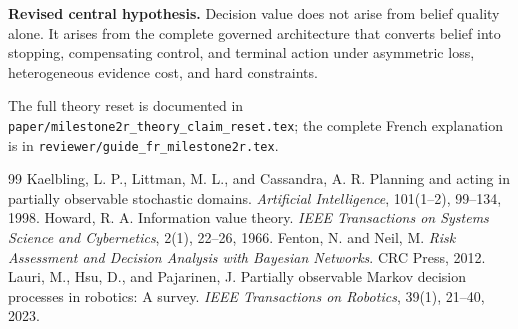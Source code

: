 \documentclass[11pt,a4paper]{article}
\begin{document}
\begin{tcolorbox}[colback=softgreen,colframe=green!45!black,boxrule=0.8pt,arc=2mm]
\textbf{Revised central hypothesis.} Decision value does not arise from belief quality alone. It arises from the complete governed architecture that converts belief into stopping, compensating control, and terminal action under asymmetric loss, heterogeneous evidence cost, and hard constraints.
\end{tcolorbox}

The full theory reset is documented in \texttt{paper/milestone2r\_theory\_claim\_reset.tex}; the complete French explanation is in \texttt{reviewer/guide\_fr\_milestone2r.tex}.

\begin{thebibliography}{99}
 Kaelbling, L. P., Littman, M. L., and Cassandra, A. R. Planning and acting in partially observable stochastic domains. \emph{Artificial Intelligence}, 101(1--2), 99--134, 1998.
 Howard, R. A. Information value theory. \emph{IEEE Transactions on Systems Science and Cybernetics}, 2(1), 22--26, 1966.
 Fenton, N. and Neil, M. \emph{Risk Assessment and Decision Analysis with Bayesian Networks}. CRC Press, 2012.
 Lauri, M., Hsu, D., and Pajarinen, J. Partially observable Markov decision processes in robotics: A survey. \emph{IEEE Transactions on Robotics}, 39(1), 21--40, 2023.
\end{thebibliography}
\end{document}

